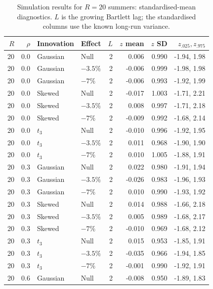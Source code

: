 \scriptsize
\setlength{\tabcolsep}{4.5pt}
\begin{table}[H]
\centering
\normalsize\renewcommand{\arraystretch}{1.55}\setlength{\tabcolsep}{4pt}
\caption{Simulation results for $R=20$ summers: standardised-mean diagnostics. $L$ is the growing Bartlett lag; the standardised columns use the known long-run variance.}
\label{tab:year-simulation-complete-b}
\begin{tabular*}{\textwidth}{@{\extracolsep{\fill}}rrllrrrr}
\toprule
$R$ & $\rho$ & Innovation & Effect & $L$ & $z$ mean & $z$ SD & $z_{.025},z_{.975}$ \\
\midrule
20 & 0.0 & Gaussian & Null & 2 & 0.006 & 0.990 & -1.94, 1.98 \\
20 & 0.0 & Gaussian & $-3.5\%$ & 2 & -0.006 & 0.999 & -1.98, 1.98 \\
20 & 0.0 & Gaussian & $-7\%$ & 2 & -0.006 & 0.993 & -1.92, 1.99 \\
20 & 0.0 & Skewed & Null & 2 & -0.017 & 1.003 & -1.71, 2.21 \\
20 & 0.0 & Skewed & $-3.5\%$ & 2 & 0.008 & 0.997 & -1.71, 2.18 \\
20 & 0.0 & Skewed & $-7\%$ & 2 & -0.009 & 0.992 & -1.68, 2.14 \\
20 & 0.0 & $t_3$ & Null & 2 & -0.010 & 0.996 & -1.92, 1.95 \\
20 & 0.0 & $t_3$ & $-3.5\%$ & 2 & 0.011 & 0.968 & -1.90, 1.90 \\
20 & 0.0 & $t_3$ & $-7\%$ & 2 & 0.010 & 1.005 & -1.88, 1.91 \\
20 & 0.3 & Gaussian & Null & 2 & 0.022 & 0.980 & -1.91, 1.94 \\
20 & 0.3 & Gaussian & $-3.5\%$ & 2 & -0.026 & 0.983 & -1.96, 1.93 \\
20 & 0.3 & Gaussian & $-7\%$ & 2 & 0.010 & 0.990 & -1.93, 1.92 \\
20 & 0.3 & Skewed & Null & 2 & 0.014 & 0.988 & -1.66, 2.18 \\
20 & 0.3 & Skewed & $-3.5\%$ & 2 & 0.005 & 0.989 & -1.68, 2.17 \\
20 & 0.3 & Skewed & $-7\%$ & 2 & -0.010 & 0.969 & -1.68, 2.12 \\
20 & 0.3 & $t_3$ & Null & 2 & 0.015 & 0.953 & -1.85, 1.91 \\
20 & 0.3 & $t_3$ & $-3.5\%$ & 2 & -0.035 & 0.966 & -1.94, 1.85 \\
20 & 0.3 & $t_3$ & $-7\%$ & 2 & -0.001 & 0.990 & -1.92, 1.91 \\
20 & 0.6 & Gaussian & Null & 2 & -0.008 & 0.950 & -1.89, 1.83 \\

\end{tabular*}
\end{table}

